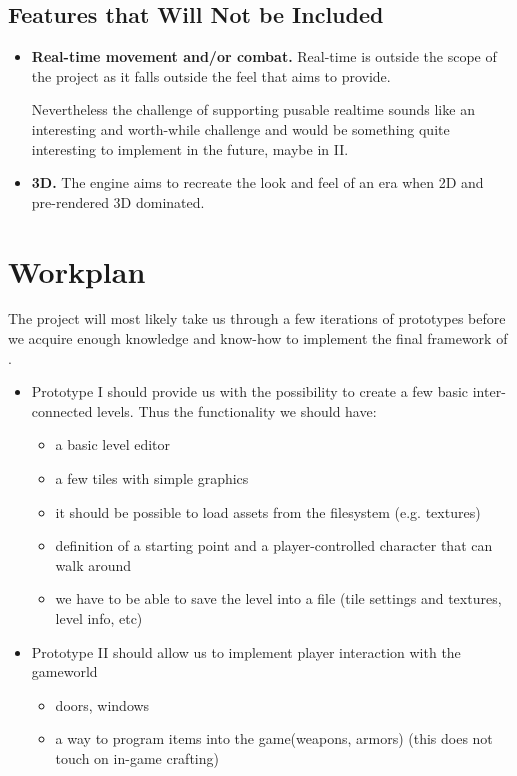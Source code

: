 \documentclass[a4paper,10pt]{book}
\begin{document}
\section{Features that Will Not be Included}
\begin{itemize}
 \item \textbf{Real-time movement and/or combat.} Real-time is outside the scope of the project as it falls outside the feel that \Gamename{} aims to provide.
 
 Nevertheless the challenge of supporting pusable realtime sounds like an interesting and worth-while challenge and would be something quite interesting to implement in the future, maybe in \Enginename{} II.
 
 \item \textbf{3D.} The engine aims to recreate the look and feel of an era when 2D and pre-rendered 3D dominated.
\end{itemize}

\chapter{Workplan}
The project will most likely take us through a few iterations of prototypes before we acquire enough knowledge and know-how to implement the final framework of \Enginename{}.

\begin{itemize}
 \item \Enginename{} Prototype I should provide us with the possibility to create a few basic inter-connected levels. Thus the functionality we should have:
 \begin{itemize}
  \item a basic level editor
  \item a few tiles with simple graphics
  \item it should be possible to load assets from the filesystem (e.g. textures)
  \item definition of a starting point and a player-controlled character that can walk around
  \item we have to be able to save the level into a file (tile settings and textures, level info, etc)
 \end{itemize}
 \item \Enginename{} Prototype II should allow us to implement player interaction with the gameworld
 \begin{itemize}
  \item doors, windows
  \item a way to program items into the game(weapons, armors) (this does not touch on in-game crafting)
 \end{itemize}
\end{itemize}
\end{document}
